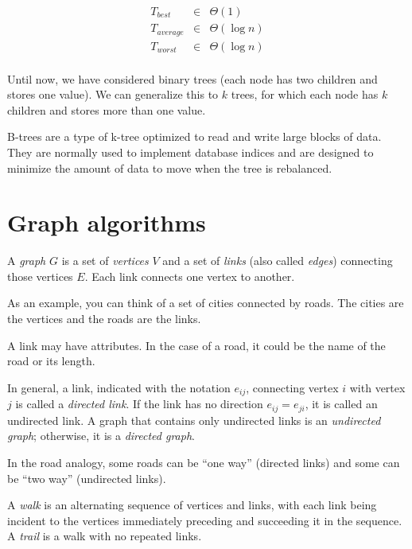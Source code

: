 \documentclass[justified, sixbynine]{tufte-book}
\theoremstyle{plain}%
\newtheorem * {corollary}{Corollary}
\theoremstyle{definition}
\theoremstyle{remark}
\newtheorem * {remark}{Remark}
\newtheorem * {note}{Note}
\begin{document}
\begin{fullwidth}
\begin{eqnarray}
T_{best} &\in &\Theta (1) \\
T_{average} &\in &\Theta (\log n) \\
T_{worst} &\in &\Theta (\log n) \\
\end{eqnarray}


Until now, we have considered binary trees (each node has two children and
stores one value). We can generalize this to $k$ trees, for which each node has $k$
children and stores more than one value.

B-trees are a type of k-tree optimized to read and write large blocks of data. They are normally used to implement database indices and are designed to minimize the amount of data to move when the tree is rebalanced.

\goodbreak\section{Graph algorithms}


A {\it graph} $G$ is a set of {\it vertices} $V$ and a set of {\it links} (also called {\it edges}) connecting those vertices $E$. Each link connects one vertex to another.

As an example, you can think of a set of cities connected by roads. The cities are the vertices and the roads are the links.

A link may have attributes. In the case of a road, it could be the name of the road or its length.

In general, a link, indicated with the notation $e_{ij}$, connecting vertex $%
i $ with vertex $j$ is called a {\it directed link}. If the link has no
direction $e_{ij}=e_{ji}$, it is called an undirected link. A graph that
contains only undirected links is an {\it undirected graph}; otherwise, it is
a {\it directed graph}.

In the road analogy, some roads can be ``one way'' (directed links) and some can be ``two way'' (undirected links).

A {\it walk} is an alternating sequence of vertices and links, with each
link being incident to the vertices immediately preceding and succeeding it
in the sequence. A {\it trail} is a walk with no repeated links.


\end{fullwidth}
\end{document}
